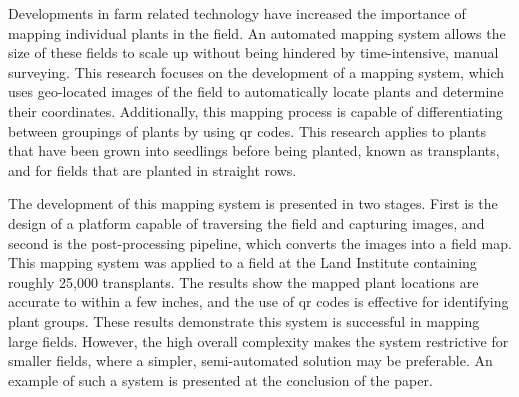 
\pagestyle{empty}
\setlength{\baselineskip}{0.8cm}




Developments in farm related technology have increased the importance of mapping individual plants in the field.  An automated mapping system allows the size of these fields to scale up without being hindered by time-intensive, manual surveying.  This research focuses on the development of a mapping system, which uses geo-located images of the field to automatically locate plants and determine their coordinates.  Additionally, this mapping process is capable of differentiating between groupings of plants by using \ac{qr} codes.  This research applies to plants that have been grown into seedlings before being planted, known as transplants, and for fields that are planted in straight rows. 

The development of this mapping system is presented in two stages.  First is the design of a platform capable of traversing the field and capturing images, and second is the post-processing pipeline, which converts the images into a field map.  This mapping system was applied to a field at the Land Institute containing roughly 25,000 transplants. The results show the mapped plant locations are accurate to within a few inches, and the use of \ac{qr} codes is effective for identifying plant groups.  These results demonstrate this system is successful in mapping large fields.  However, the high overall complexity makes the system restrictive for smaller fields, where a simpler, semi-automated solution may be preferable. An example of such a system is presented at the conclusion of the paper.
